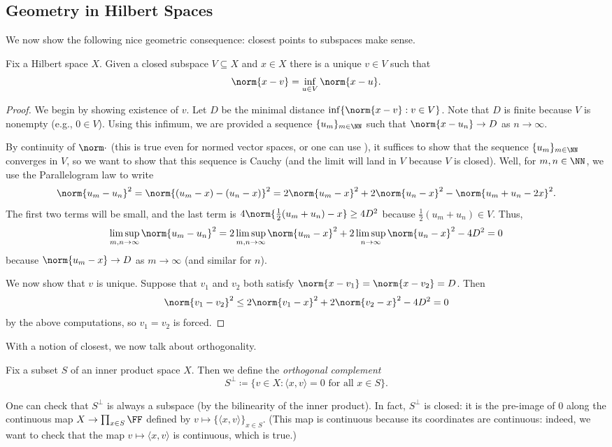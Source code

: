 \documentclass[../notes.tex]{subfiles}
\begin{document}
\subsection{Geometry in Hilbert Spaces}
We now show the following nice geometric consequence: closest points to subspaces make sense.
\begin{lemma} \label{lem:closest-vector}
	Fix a Hilbert space $X$. Given a closed subspace $V\subseteq X$ and $x\in X$ there is a unique $v\in V$ such that
	\[\norm{x-v}=\inf_{u\in V}\norm{x-u}.\]
\end{lemma}
\begin{proof}
	We begin by showing existence of $v$. Let $D$ be the minimal distance $\inf\{\norm{x-v}:v\in V\}$. Note that $D$ is finite because $V$ is nonempty (e.g., $0\in V$). Using this infimum, we are provided a sequence $\{u_m\}_{m\in\NN}$ such that $\norm{x-u_n}\to D$ as $n\to\infty$.
	
	By continuity of $\norm\cdot$ (this is true even for normed vector spaces, or one can use ), it suffices to show that the sequence $\{u_m\}_{m\in\NN}$ converges in $V$, so we want to show that this sequence is Cauchy (and the limit will land in $V$ because $V$ is closed). Well, for $m,n\in\NN$, we use the Parallelogram law  to write
	\[\norm{u_m-u_n}^2=\norm{(u_m-x)-(u_n-x)}^2=2\norm{u_m-x}^2+2\norm{u_n-x}^2-\norm{u_m+u_n-2x}^2.\]
	The first two terms will be small, and the last term is $4\norm{\frac12(u_m+u_n)-x}\ge4D^2$ because $\frac12(u_m+u_n)\in V$. Thus,
	\[\limsup_{m,n\to\infty}\norm{u_m-u_n}^2=2\limsup_{m,n\to\infty}\norm{u_m-x}^2+2\limsup_{n\to\infty}\norm{u_n-x}^2-4D^2=0\]
	because $\norm{u_m-x}\to D$ as $m\to\infty$ (and similar for $n$).

	We now show that $v$ is unique. Suppose that $v_1$ and $v_2$ both satisfy $\norm{x-v_1}=\norm{x-v_2}=D$. Then
	\[\norm{v_1-v_2}^2\le2\norm{v_1-x}^2+2\norm{v_2-x}^2-4D^2=0\]
	by the above computations, so $v_1=v_2$ is forced.
\end{proof}
With a notion of closest, we now talk about orthogonality.
\begin{definition}
	Fix a subset $S$ of an inner product space $X$. Then we define the \textit{orthogonal complement}
	\[S^\perp\coloneqq\{v\in X:\langle x,v\rangle=0\text{ for all }x\in S\}.\]
\end{definition}
\begin{remark}
	One can check that $S^\perp$ is always a subspace (by the bilinearity of the inner product). In fact, $S^\perp$ is closed: it is the pre-image of $0$ along the continuous map $X\to\prod_{x\in S}\FF$ defined by $v\mapsto\{\langle x,v\rangle\}_{x\in S}$. (This map is continuous because its coordinates are continuous: indeed, we want to check that the map $v\mapsto\langle x,v\rangle$ is continuous, which is true.)
\end{remark}
\end{document}

